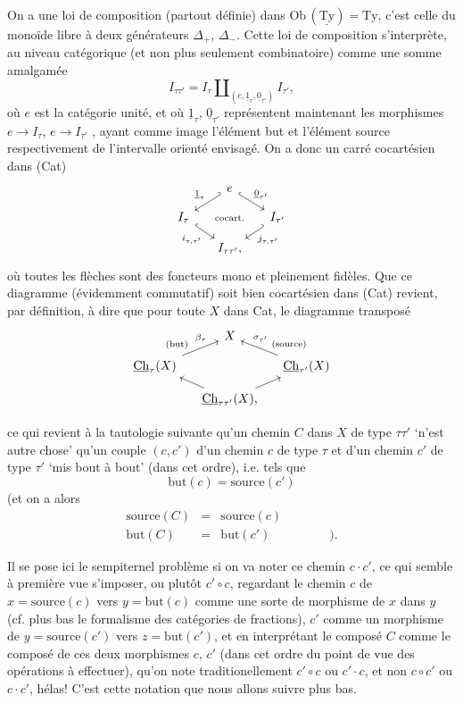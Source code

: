 \documentclass[11pt]{article}
\newcommand{\printedpage}[1]{\if\relax\detokenize{#1}\relax\else\marginpar{\raggedright\footnotesize p.~#1}\fi}
\newcommand{\msp}[1]{\marginpar{\raggedright\footnotesize [#1]}}
\newcommand{\uCh}{\underline{\mathrm{Ch}}}
\newcommand{\Ty}{\mathrm{Ty}}
\newcommand{\uTy}{\underline{\mathrm{Ty}}}
\begin{document}
On a une loi de composition (partout définie) dans $\mathrm{Ob}\,(\uTy) = \Ty$, c'est celle du monoïde libre à deux générateurs $\Delta_+$, $\Delta_-$. Cette loi de composition s'interprète, au niveau catégorique (et non plus seulement combinatoire) comme une somme amalgamée
\[
I_{\tau\tau'} = I_\tau \amalg_{(e, \underline{1}_\tau, \underline{0}_{\tau'})} I_{\tau'},
\]
où $e$ est la catégorie unité, et où $\underline{1}_\tau$, $\underline{0}_{\tau'}$ représentent maintenant les morphismes $e \longrightarrow I_\tau$, $e \longrightarrow I_{\tau'}$ , ayant comme image l'élément but et l'élément source respectivement de l'intervalle orienté envisagé. On a donc un carré cocartésien dans (Cat)
\[
\begin{tikzcd}[column sep=small, row sep=small]
 & e \arrow[dl, hook', "\underline{1}_\tau"'] \arrow[dr, hook, "\underline{0}_{\tau'}"] & \\
I_\tau \arrow[dr, hook, "i_{\tau,\tau'}"'] & \text{\scriptsize cocart.} & I_{\tau'} \arrow[dl, hook', "j_{\tau,\tau'}"] \\
 & I_{\tau\tau'}, &
\end{tikzcd}
\]
où toutes les flèches sont des foncteurs mono et pleinement fidèles. Que ce diagramme (évidemment commutatif) soit bien cocartésien dans (Cat) revient, par définition, à dire que pour toute $X$ dans Cat, le diagramme transposé
\[
\begin{tikzcd}[column sep=small, row sep=small]
 & X & \\
\uCh_\tau(X) \arrow[ur, "\beta_\tau" near end, "\text{\scriptsize (but)}" near start] & & \uCh_{\tau'}(X) \arrow[ul, "\sigma_{\tau'}"' near end, "\text{\scriptsize (source)}"' near start] \\
 & \uCh_{\tau\tau'}(X), \arrow[ul] \arrow[ur] &
\end{tikzcd}
\]



\msp{page 49}ce qui revient à la tautologie suivante qu'un chemin $C$ dans $X$ de type $\tau\tau'$ `n'est autre chose' qu'un couple $(c,c')$ d'un chemin $c$ de type $\tau$ et d'un chemin $c'$ de type $\tau'$ `mis bout à bout' (dans cet ordre), i.e. tels que
\[
\mathrm{but}(c) = \mathrm{source}(c')
\]
(et on a alors
\[
\begin{array}{rcll}
\mathrm{source}(C) & = & \mathrm{source}(c) & \\[1ex]
\mathrm{but}(C) & = & \mathrm{but}(c') & \qquad\quad ).
\end{array}
\]

\printedpage{33}
Il se pose ici le sempiternel problème si on va noter ce chemin $c{\cdot}c'$, ce qui semble à première vue s'imposer, ou plutôt $c' \circ c$, regardant le chemin $c$ de $x = \mathrm{source}(c)$ vers $y = \mathrm{but}(c)$ comme une sorte de morphisme de $x$ dans $y$ (cf. plus bas le formalisme des catégories de fractions), $c'$ comme un morphisme de $y = \mathrm{source}(c')$ vers $z = \mathrm{but}(c')$, et en interprétant le composé $C$ comme le composé de ces deux morphismes $c$, $c'$ (dans cet ordre du point de vue des opérations à effectuer), qu'on note traditionellement $c' \circ c$ ou $c' \cdot c$, et non $c \circ c'$ ou $c \cdot c'$, hélas! C'est cette notation que nous allons suivre plus bas. %
\end{document}
